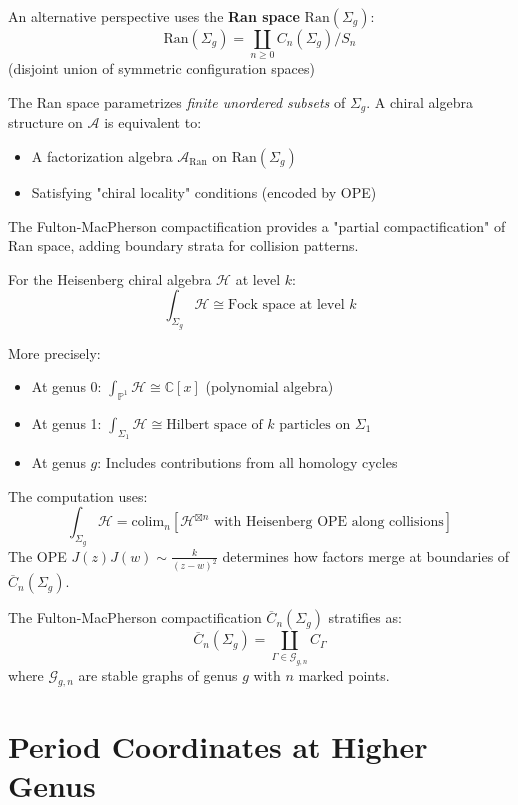 \begin{remark}\label{rem:ran-space}
An alternative perspective uses the \textbf{Ran space} $\text{Ran}(\Sigma_g)$:
$$\text{Ran}(\Sigma_g) = \coprod_{n \geq 0} C_n(\Sigma_g) / S_n$$
(disjoint union of symmetric configuration spaces)

The Ran space parametrizes \emph{finite unordered subsets} of $\Sigma_g$. A chiral algebra structure on $\mathcal{A}$ is equivalent to:
\begin{itemize}
\item A factorization algebra $\mathcal{A}_{\text{Ran}}$ on $\text{Ran}(\Sigma_g)$
\item Satisfying "chiral locality" conditions (encoded by OPE)
\end{itemize}

The Fulton-MacPherson compactification provides a "partial compactification" of Ran space, adding boundary strata for collision patterns.
\end{remark}

\begin{example}\label{ex:fact-heisenberg}
For the Heisenberg chiral algebra $\mathcal{H}$ at level $k$:
$$\int_{\Sigma_g} \mathcal{H} \cong \text{Fock space at level } k$$

More precisely:
\begin{itemize}
\item At genus 0: $\int_{\mathbb{P}^1} \mathcal{H} \cong \mathbb{C}[x]$ (polynomial algebra)
\item At genus 1: $\int_{\Sigma_1} \mathcal{H} \cong \text{Hilbert space of } k \text{ particles on } \Sigma_1$
\item At genus $g$: Includes contributions from all homology cycles
\end{itemize}

The computation uses:
$$\int_{\Sigma_g} \mathcal{H} = \text{colim}_n \left[\mathcal{H}^{\boxtimes n} \text{ with Heisenberg OPE along collisions}\right]$$
The OPE $J(z)J(w) \sim \frac{k}{(z-w)^2}$ determines how factors merge at boundaries of $\overline{C}_n(\Sigma_g)$.
\end{example}

The Fulton-MacPherson compactification $\overline{C}_n(\Sigma_g)$ stratifies as:
$$\overline{C}_n(\Sigma_g) = \coprod_{\Gamma \in \mathcal{G}_{g,n}} C_{\Gamma}$$
where $\mathcal{G}_{g,n}$ are stable graphs of genus $g$ with $n$ marked points.

\section{Period Coordinates at Higher Genus}

